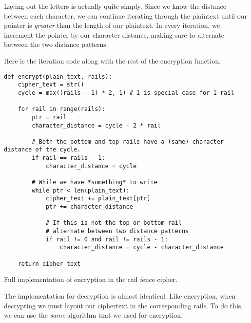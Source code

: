 Laying out the letters is actually quite simply. Since we know the distance between each character, we can continue
iterating through the plaintext until our pointer is \textit{greater} than the length of our plaintext. In every iteration,
we increment the pointer by our character distance, making sure to alternate between the two distance patterns. 

Here is the iteration code along with the rest of the encryption function.

\begin{listing}[H]
    \begin{verbatim}
def encrypt(plain_text, rails):
    cipher_text = str()
    cycle = max((rails - 1) * 2, 1) # 1 is special case for 1 rail
            
    for rail in range(rails):
        ptr = rail
        character_distance = cycle - 2 * rail
                
        # Both the bottom and top rails have a (same) character distance of the cycle. 
        if rail == rails - 1:
            character_distance = cycle
        
        # While we have *something* to write
        while ptr < len(plain_text):
            cipher_text += plain_text[ptr]
            ptr += character_distance
        
            # If this is not the top or bottom rail 
            # alternate between two distance patterns
            if rail != 0 and rail != rails - 1:
                character_distance = cycle - character_distance
        
    return cipher_text
        \end{verbatim}
        \caption{Full implementation of encryption in the rail fence cipher.}
\end{listing}

The implementation for decryption is almost identical. Like encryption, when decrypting we must layout our ciphertext in the corresponding
rails. To do this, we can use the \textit{same} algorithm that we used for encryption. 

